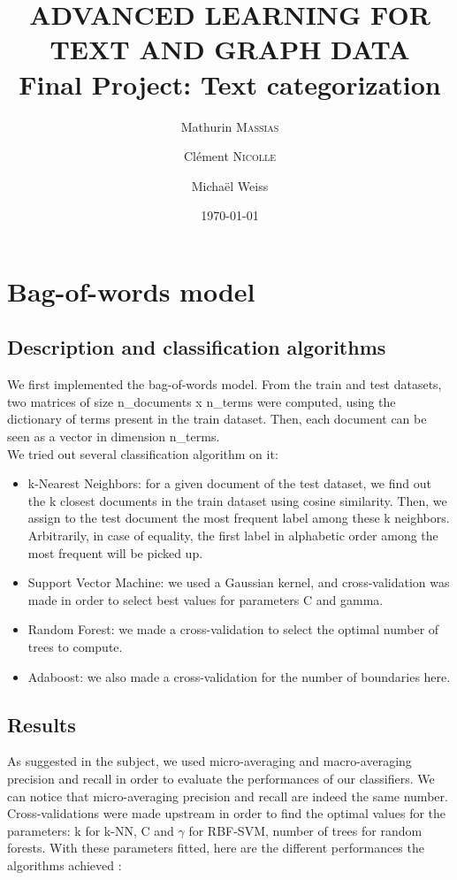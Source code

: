 \documentclass[11pt,a4paper]{article}
\title{ADVANCED LEARNING FOR TEXT AND GRAPH DATA \\ Final Project: Text categorization}
\author{Mathurin \textsc{Massias} \and Clément \textsc{Nicolle} \and Michaël Weiss}
\date{\today}
\begin{document}
	
\maketitle

\section{Bag-of-words model}

\subsection{Description and classification algorithms}

We first implemented the bag-of-words model. From the train and test datasets, two matrices of size n\_documents x n\_terms were computed, using the dictionary of terms present in the train dataset. Then, each document can be seen as a vector in dimension n\_terms.
\\We tried out several classification algorithm on it:
\begin{itemize}
	\item k-Nearest Neighbors: for a given document of the test dataset, we find out the k closest documents in the train dataset using cosine similarity. Then, we assign to the test document the most frequent label among these k neighbors. Arbitrarily, in case of equality, the first label in alphabetic order among the most frequent will be picked up.
	\item Support Vector Machine: we used a Gaussian kernel, and cross-validation was made in order to select best values for parameters C and gamma.
	\item Random Forest: we made a cross-validation to select the optimal number of trees to compute.
	\item Adaboost: we also made a cross-validation for the number of boundaries here.
\end{itemize}


\subsection{Results}

As suggested in the subject, we used micro-averaging and macro-averaging precision and recall in order to evaluate the performances of our classifiers. We can notice that micro-averaging precision and recall are indeed the same number.
\\Cross-validations were made upstream in order to find the optimal values for the parameters: k for k-NN, C and $\gamma$ for RBF-SVM, number of trees for random forests. With these parameters fitted, here are the different performances the algorithms achieved :
\end{document}
